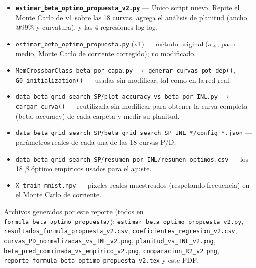 \documentclass[11pt]{article}
\begin{document}
\begin{itemize}
\item \textbf{\texttt{estimar\_beta\_optimo\_propuesta\_v2.py}} --- Único
  script nuevo. Repite el Monte Carlo de v1 sobre las 18 curvas, agrega el
  análisis de planitud (ancho @99\% y curvatura), y las 4 regresiones
  log-log.
\item \texttt{estimar\_beta\_optimo\_propuesta.py} (v1) --- método
  original ($\sigma_W$, paso medio, Monte Carlo de corriente corregido);
  no modificado.
\item \texttt{MemCrossbarClass\_beta\_por\_capa.py}
  $\to$ \texttt{generar\_curvas\_pot\_dep()}, \texttt{G0\_initialization()}
  --- usadas sin modificar, tal como en la red real.
\item \texttt{data\_beta\_grid\_search\_SP/plot\_accuracy\_vs\_beta\_por\_INL.py}
  $\to$ \texttt{cargar\_curva()} --- reutilizada sin modificar para obtener
  la curva completa (beta, accuracy) de cada carpeta y medir su planitud.
\item \texttt{data\_beta\_grid\_search\_SP/beta\_grid\_search\_SP\_INL\_*/config\_*.json}
  --- parámetros reales de cada una de las 18 curvas P/D.
\item \texttt{data\_beta\_grid\_search\_SP/resumen\_por\_INL/resumen\_optimos.csv}
  --- los 18 $\beta$ óptimo empíricos usados para el ajuste.
\item \texttt{X\_train\_mnist.npy} --- píxeles reales muestreados
  (respetando frecuencia) en el Monte Carlo de corriente.
\end{itemize}

Archivos generados por este reporte (todos en
\texttt{formula\_beta\_optimo\_propuesta/}):
\texttt{estimar\_beta\_optimo\_propuesta\_v2.py},
\texttt{resultados\_formula\_propuesta\_v2.csv},
\texttt{coeficientes\_regresion\_v2.csv},
\texttt{curvas\_PD\_normalizadas\_vs\_INL\_v2.png},
\texttt{planitud\_vs\_INL\_v2.png},
\texttt{beta\_pred\_combinada\_vs\_empirico\_v2.png},
\texttt{comparacion\_R2\_v2.png},
\texttt{reporte\_formula\_beta\_optimo\_propuesta\_v2.tex} y este PDF.
\end{document}
